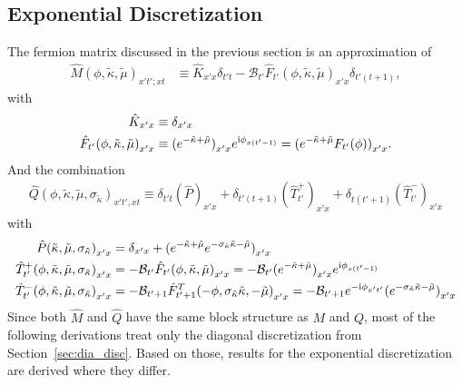 \documentclass[a4paper, fleqn, twoside, notitlepage]{scrartcl}
\begin{document}
\subsection{Exponential Discretization}\label{sec:exp_disc}

The fermion matrix discussed in the previous section is an approximation of
\begin{align}
  {\hat{M}(\phi, \tilde{\kappa}, \tilde{\mu})}_{x't';xt}
  &\equiv {\hat{K}}_{x'x}\delta_{t't} - \mathcal{B}_{t'}{\hat{F}_{t'}(\phi, \tilde{\kappa}, \tilde{\mu})}_{x'x}\delta_{t'(t+1)},\label{eq:def_m_exp}
\end{align}
with
\begin{align}
  {\hat{K}}_{x'x} &\equiv \delta_{x'x}\\
  {\hat{F}_{t'}(\phi, \tilde{\kappa}, \tilde{\mu})}_{x'x} &\equiv {(e^{-\tilde{\kappa}+\tilde{\mu}})}_{x'x} e^{\mathrm{i} \phi_{x(t'-1)}} = {(e^{-\tilde{\kappa}+\tilde{\mu}} F_{t'}(\phi) )}_{x'x}.
\end{align}
And the combination
\begin{align}
  {\hat{Q}(\phi, \tilde{\kappa}, \tilde{\mu}, \sigma_{\tilde{\kappa}})}_{x't',xt}
  \equiv \delta_{t't}{(\hat{P})}_{x'x} + \delta_{t'(t+1)}{(\hat{T}^+_{t'})}_{x'x} + \delta_{t(t'+1)}{(\hat{T}^-_{t'})}_{x'x}
\end{align}
with
\begin{align}
  {\hat{P}(\tilde{\kappa}, \tilde{\mu}, \sigma_{\tilde{\kappa}})}_{x'x} &= \delta_{x'x} + {(e^{-\tilde{\kappa}+\tilde{\mu}} e^{-\sigma_{\tilde{\kappa}}\tilde{\kappa} - \tilde{\mu}})}_{x'x}\\
  {\hat{T}^+_{t'}(\phi, \tilde{\kappa}, \tilde{\mu}, \sigma_{\tilde{\kappa}})}_{x'x} &= - \mathcal{B}_{t'} {\hat{F}_{t'}(\phi, \tilde{\kappa}, \tilde{\mu})}_{x'x} = - \mathcal{B}_{t'} {(e^{-\tilde{\kappa}+\tilde{\mu}})}_{x'x} e^{\mathrm{i} \phi_{x(t'-1)}}\\
  {\hat{T}^-_{t'}(\phi, \tilde{\kappa}, \tilde{\mu}, \sigma_{\tilde{\kappa}})}_{x'x} &= - \mathcal{B}_{t'+1} {\hat{F}^T_{t'+1}(-\phi, \sigma_{\tilde{\kappa}}\tilde{\kappa}, -\tilde{\mu})}_{x'x} = - \mathcal{B}_{t'+1} e^{-\mathrm{i} \phi_{x't'}} {(e^{-\sigma_{\tilde{\kappa}}\tilde{\kappa}-\tilde{\mu}})}_{x'x}
\end{align}
Since both $\hat{M}$ and $\hat{Q}$ have the same block structure as $M$ and $Q$, most of the following derivations treat only the diagonal discretization from Section~\ref{sec:dia_disc}.
Based on those, results for the exponential discretization are derived where they differ.
\end{document}
